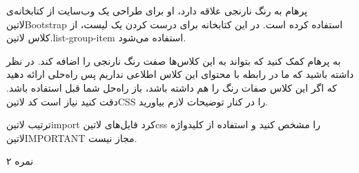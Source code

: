 
پرهام به رنگ نارنجی علاقه دارد، او برای طراحی یک وب‌سایت از کتابخانه‌ی
‌لاتین{Bootstrap}
استفاده کرده است. در این کتابخانه برای درست کردن
یک لیست، از کلاس ‌لاتین{.list-group-item}
استفاده می‌شود.

به پرهام کمک کنید که بتواند به این کلاس‌ها صفت رنگ نارنجی را اضافه کند.
در نظر داشته باشید که ما در رابطه با محتوای این کلاس اطلاعی نداریم
پس راه‌حلی ارائه دهید که اگر این کلاس صفات رنگ را هم داشته باشد، باز راه‌حل شما قبل استفاده باشد.
دقت کنید نیاز است کد ‌لاتین{CSS} را در کنار توضیحات لازم بیاورید.

ترتیب ‌لاتین{import} کرد فایل‌های ‌لاتین{css} را مشخص کنید
و استفاده از کلیدواژه ‌لاتین{IMPORTANT} مجاز نیست.

۲ نمره
